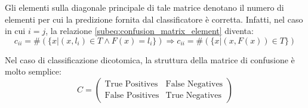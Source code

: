         Gli elementi sulla diagonale principale di tale matrice denotano il numero di elementi per cui la predizione fornita dal classificatore è corretta. Infatti, nel caso in cui $i = j$, la relazione \ref{subeq:confusion_matrix_element} diventa:
        \begin{equation}
            c_{ii} = \#(\{x|(x,l_i) \in T \wedge F(x) = l_i\}) \Longrightarrow c_{ii} = \#(\{x|(x,F(x)) \in T\})
        \end{equation}

        Nel caso di classificazione dicotomica, la struttura della matrice di confusione è molto semplice:
        \begin{equation}\label{eq:confusion_matrix}
            C = \left(
            \begin{array}{cc}
            \text{True Positives} & \text{False Negatives}\\
            \text{False Positives} & \text{True Negatives}
            \end{array} \right)
        \end{equation}

